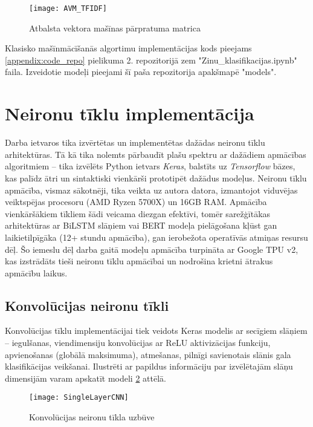 \begin{figure}[H]
	\centering
	\texttt{[image: AVM\_TFIDF]}
	\caption{Atbalsta vektora mašīnas pārpratuma matrica}
	\label{fig:AVM_TFIDF}
\end{figure}

Klasisko mašīnmācīšanās algortimu implementācijas kods pieejams \ref{appendix:code_repo} pielikuma 2. repozitorijā zem "Zinu\_klasifikacijas.ipynb" faila. Izveidotie modeļi pieejami šī paša repozitorija apakšmapē "models".

\pagebreak
\section{Neironu tīklu implementācija}

Darba ietvaros tika izvērtētas un implementētas dažādas neironu tīklu arhitektūras. Tā kā tika nolemts pārbaudīt plašu spektru ar dažādiem apmācības algoritmiem – tika izvēlēts Python ietvars \textit{Keras}, balstīts uz \textit{Tensorflow} bāzes, kas palīdz ātri un sintaktiski vienkārši prototipēt dažādus modeļus. Neironu tīklu apmācība, vismaz sākotnēji, tika veikta uz autora datora, izmantojot viduvējas veiktspējas procesoru (AMD Ryzen 5700X) un 16GB RAM. Apmācība vienkāršākiem tīkliem šādi veicama diezgan efektīvi, tomēr sarežģītākas arhitektūras ar BiLSTM slāņiem vai BERT modeļa pielāgošana kļūst gan laikietilpīgāka (12+ stundu apmācība), gan ierobežota operatīvās atmiņas resursu dēļ. Šo iemeslu dēļ darba gaitā modeļu apmācība turpināta ar Google TPU v2, kas izstrādāts tieši neironu tīklu apmācībai un nodrošina krietni ātrakus apmācību laikus.

\subsection{Konvolūcijas neironu tīkli}
Konvolūcijas tīklu implementācijai tiek veidots Keras modelis ar secīgiem slāņiem – iegulšanas, viendimensiju konvolūcijas ar ReLU aktivizācijas funkciju, apvienošanas (globālā maksimuma), atmešanas, pilnīgi savienotais slānis gala klasifikācijas veikšanai. Ilustrēti ar papildus informāciju par izvēlētajām slāņu dimensijām varam apskatīt modeli \ref{fig:SingleLayerCNN} attēlā.

\begin{figure}[H]
	\centering
	\texttt{[image: SingleLayerCNN]}
	\caption{Konvolūcijas neironu tīkla uzbūve}
	\label{fig:SingleLayerCNN}
\end{figure}

